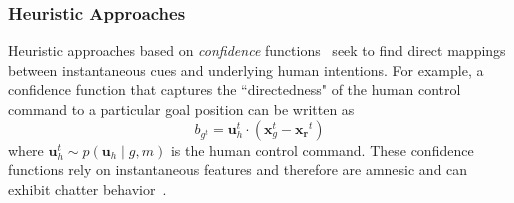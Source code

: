 \documentclass[letterpaper, 10 pt, conference]{ieeeconf}  %
\newcommand{\norm}[1]{\left\lVert#1\right\rVert}
\begin{document}
\subsubsection{Heuristic Approaches}
Heuristic approaches based on \textit{confidence} functions~\cite{gopinath2017human} seek to find direct mappings between instantaneous cues and underlying human intentions. 
For example, a confidence function that captures the ``directedness" of the human control command to a particular goal position can be written as 
% 
\begin{equation*}
	b_{g^t} =  \boldsymbol{u}_h^t\cdot(\boldsymbol{x}_{g}^t - \boldsymbol{x_r}^t)
\end{equation*}
where $\boldsymbol{u}_h^t \sim p(\boldsymbol{u}_h\;|\;g, m)$ is the human control command. These confidence functions rely on instantaneous features and therefore are amnesic and can exhibit chatter behavior~\cite{dragan2012formalizing}. 

\end{document}
